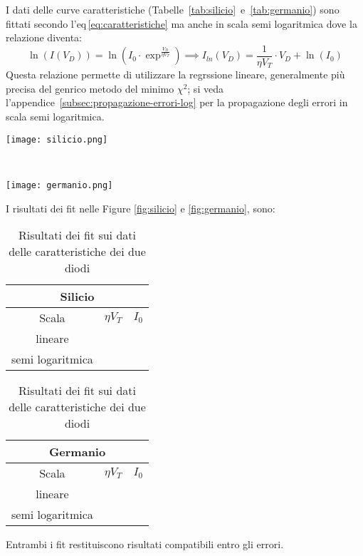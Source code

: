 \documentclass[@SRC@/main]{subfiles}
\begin{document}
I dati delle curve caratteristiche (Tabelle~\ref{tab:silicio}~e~\ref{tab:germanio}) sono
fittati secondo l'eq\,\eqref{eq:caratteristiche} ma anche in scala semi logaritmica dove la
relazione diventa:
\begin{equation*}
  \ln (I(V_D)) = \ln \left( I_0 \cdot \exp^{\frac{V_D}{\eta V_T}} \right) \implies
  I_{ln}(V_D) = \frac{1}{\eta V_T} \cdot V_D + \ln (I_0)
\end{equation*}
Questa relazione permette di utilizzare la regrssione lineare, generalmente
più precisa del genrico metodo del minimo $\chi^2$; si veda
l'appendice~\ref{subsec:propagazione-errori-log} per la propagazione degli
errori in scala semi logaritmica.
\begin{center}
\begin{minipage}{.95\textwidth}
  \centering
  \texttt{[image: silicio.png]}
  \label{fig:silicio}
\end{minipage}
\\
\begin{minipage}{.95\textwidth}
  \centering
  \texttt{[image: germanio.png]}
  \label{fig:germanio}
\end{minipage}
\end{center}
I risultati dei fit nelle Figure \ref{fig:silicio} e \ref{fig:germanio}, sono:
\begin{table}
  \centering
  \begin{subtable}{.45\textwidth}
    \centering
    \begin{tabular}{||c|c|c||}
      \hline
      \multicolumn{3}{||c||}{Silicio} \\
      \hline
      Scala & $\eta V_T$ & $I_0$ \\
      \hline
      lineare & & \\
      \hline
      semi logaritmica & & \\
      \hline
    \end{tabular}
    \caption{Risultati fit caratteristica diodo al silicio}
    \label{tab:fit-silicio}
  \end{subtable}
  \hfill
  \begin{subtable}{.45\textwidth}
    \centering
    \begin{tabular}{||c|c|c||}
      \hline
      \multicolumn{3}{||c||}{Germanio} \\
      \hline
      Scala & $\eta V_T$ & $I_0$ \\
      \hline
      lineare & & \\
      \hline
      semi logaritmica & & \\
      \hline
    \end{tabular}
    \caption{Risultati fit caratteristica diodo al germanio}
    \label{tab:fit-germanio}
  \end{subtable}
  \caption{Risultati dei fit sui dati delle caratteristiche dei due diodi}
  \label{tab:fit-diodi}
\end{table}

Entrambi i fit restituiscono risultati compatibili entro gli errori.
\end{document}

